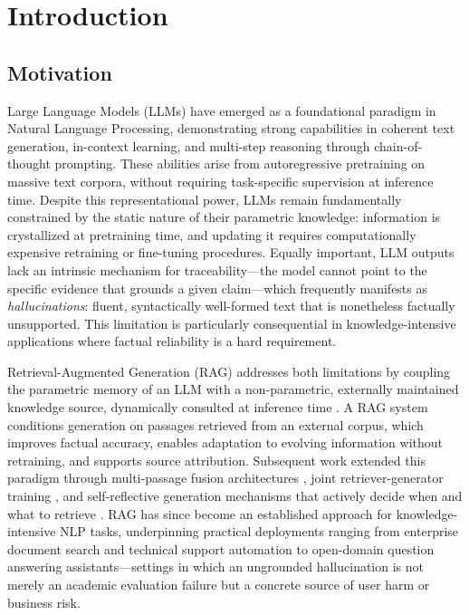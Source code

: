 \renewcommand{\chaptername}{Chapter}\renewcommand{\tablename}{Table}
\renewcommand{\figurename}{Figure}
\chapter{Introduction}
\label{chapter:introduction}

\section{Motivation}
\label{sec:intro-motivation}

Large Language Models (LLMs) have emerged as a foundational paradigm in Natural Language Processing, demonstrating strong capabilities in coherent text generation, in-context learning, and multi-step reasoning through chain-of-thought prompting. These abilities arise from autoregressive pretraining on massive text corpora, without requiring task-specific supervision at inference time. Despite this representational power, LLMs remain fundamentally constrained by the static nature of their parametric knowledge: information is crystallized at pretraining time, and updating it requires computationally expensive retraining or fine-tuning procedures. Equally important, LLM outputs lack an intrinsic mechanism for traceability---the model cannot point to the specific evidence that grounds a given claim---which frequently manifests as \textit{hallucinations}: fluent, syntactically well-formed text that is nonetheless factually unsupported. This limitation is particularly consequential in knowledge-intensive applications where factual reliability is a hard requirement.

Retrieval-Augmented Generation (RAG) addresses both limitations by coupling the parametric memory of an LLM with a non-parametric, externally maintained knowledge source, dynamically consulted at inference time \citep{lewis2020retrieval}. A RAG system conditions generation on passages retrieved from an external corpus, which improves factual accuracy, enables adaptation to evolving information without retraining, and supports source attribution. Subsequent work extended this paradigm through multi-passage fusion architectures \citep{izacard2021leveraging}, joint retriever-generator training \citep{izacard2023atlas}, and self-reflective generation mechanisms that actively decide when and what to retrieve \citep{asai2024selfrag}. RAG has since become an established approach for knowledge-intensive NLP tasks, underpinning practical deployments ranging from enterprise document search and technical support automation to open-domain question answering assistants---settings in which an ungrounded hallucination is not merely an academic evaluation failure but a concrete source of user harm or business risk.

